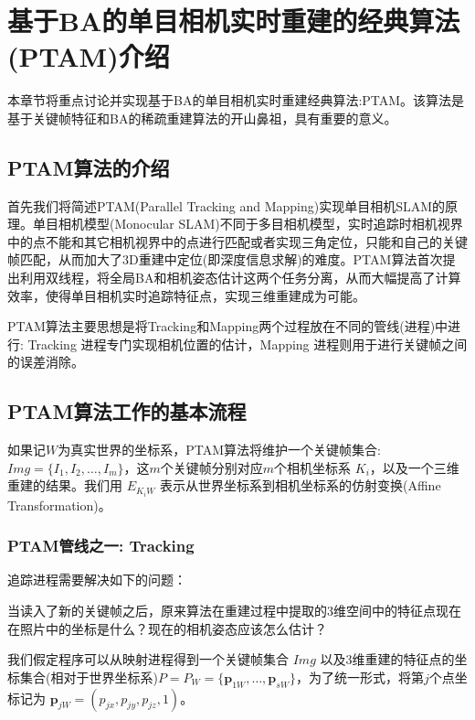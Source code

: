 
\def \R2{\mathbb{R}^2}
\def \R3{\mathbb{R}^3}
\def \Rn{\mathbb{R}^n}

\def \itW{\mathit{W}}

\def \itK{\mathit{K}}
\def \bfp{\mathbf{p}}

\chapter{基于BA的单目相机实时重建的经典算法(PTAM)介绍}

本章节将重点讨论并实现基于BA的单目相机实时重建经典算法:PTAM。该算法是基于关键帧特征和BA的稀疏重建算法的开山鼻祖，具有重要的意义。

\section{PTAM算法的介绍}
首先我们将简述PTAM\cite{Klein2007}(Parallel Tracking and Mapping)实现单目相机SLAM的原理。单目相机模型(Monocular SLAM)不同于多目相机模型，实时追踪时相机视界中的点不能和其它相机视界中的点进行匹配或者实现三角定位，只能和自己的关键帧匹配，从而加大了3D重建中定位(即深度信息求解)的难度。PTAM算法首次提出利用双线程，将全局BA和相机姿态估计这两个任务分离，从而大幅提高了计算效率，使得单目相机实时追踪特征点，实现三维重建成为可能。

PTAM算法主要思想是将Tracking和Mapping两个过程放在不同的管线(进程)中进行: Tracking 进程专门实现相机位置的估计，Mapping 进程则用于进行关键帧之间的误差消除。

\section{PTAM算法工作的基本流程}
如果记$\itW$为真实世界的坐标系，PTAM算法将维护一个关键帧集合: $Img=\{I_1,I_2,\ldots,I_m\}$，这\(m\)个关键帧分别对应\(m\)个相机坐标系 $\itK_i$，以及一个三维重建的结果。我们用 $E_{\itK_i\itW}$ 表示从世界坐标系到相机坐标系的仿射变换(Affine Transformation)。


\subsection{PTAM管线之一: Tracking}


追踪进程需要解决如下的问题：

当读入了新的关键帧之后，原来算法在重建过程中提取的3维空间中的特征点现在在照片中的坐标是什么？现在的相机姿态应该怎么估计？ 

我们假定程序可以从映射进程得到一个关键帧集合 $Img$ 以及3维重建的特征点的坐标集合(相对于世界坐标系)$P=P_\itW=\{\bfp_{1\itW},\ldots,\bfp_{s\itW}\}$，为了统一形式，将第$j$个点坐标记为 $\bfp_{j\itW}= (p_{jx},p_{jy},p_{jz},1)$。

